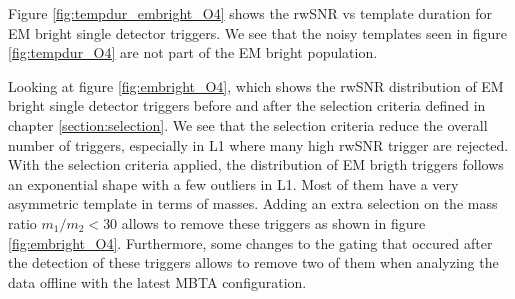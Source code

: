 Figure \ref{fig:tempdur_embright_O4} shows the rwSNR vs template duration for EM bright single detector triggers.
We see that the noisy templates seen in figure \ref{fig:tempdur_O4} are not part of the EM bright population.

Looking at figure \ref{fig:embright_O4}, which shows the rwSNR distribution of EM bright single detector triggers before and after the selection criteria defined in chapter \ref{section:selection}.
We see that the selection criteria reduce the overall number of triggers, especially in L1 where many high rwSNR trigger are rejected.
With the selection criteria applied, the distribution of EM brigth triggers follows an exponential shape with a few outliers in L1.
Most of them have a very asymmetric template in terms of masses.
Adding an extra selection on the mass ratio $m_1/m_2<30$ allows to remove these triggers as shown in figure \ref{fig:embright_O4}.
Furthermore, some changes to the gating that occured after the detection of these triggers allows to remove two of them when analyzing the data offline with the latest MBTA configuration.

